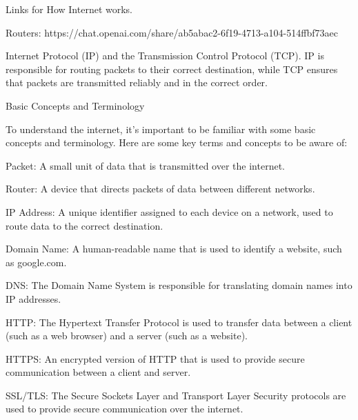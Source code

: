 Links for How Internet works.

Routers: 
    https://chat.openai.com/share/ab5abac2-6f19-4713-a104-514ffbf73aec

    Internet Protocol (IP) and the Transmission Control Protocol (TCP).
    IP is responsible for routing packets to their correct destination, while 
    TCP ensures that packets are transmitted reliably and in the correct order.

Basic Concepts and Terminology

To understand the internet, it’s important to be familiar with some basic concepts and terminology. Here are some key terms and concepts to be aware of:

Packet: A small unit of data that is transmitted over the internet.

Router: A device that directs packets of data between different networks.

IP Address: A unique identifier assigned to each device on a network, used to route data to the correct destination.

Domain Name: A human-readable name that is used to identify a website, such as google.com.

DNS: The Domain Name System is responsible for translating domain names into IP addresses.

HTTP: The Hypertext Transfer Protocol is used to transfer data between a client (such as a web browser) and a server (such as a website).

HTTPS: An encrypted version of HTTP that is used to provide secure communication between a client and server.

SSL/TLS: The Secure Sockets Layer and Transport Layer Security protocols are used to provide secure communication over the internet.












































